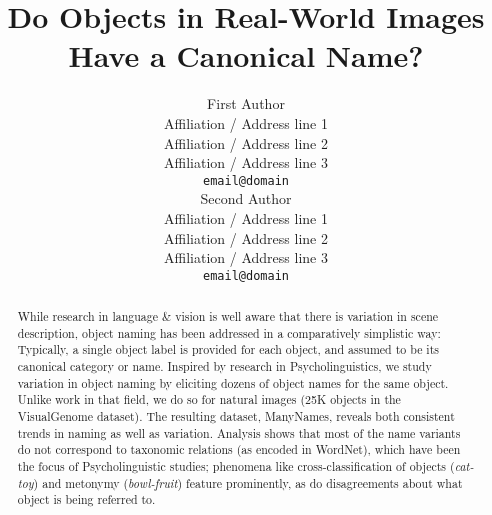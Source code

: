 \documentclass[11pt,a4paper]{article}
\title{Do Objects in Real-World Images Have a Canonical Name?}
\author{First Author \\
  Affiliation / Address line 1 \\
  Affiliation / Address line 2 \\
  Affiliation / Address line 3 \\
  {\tt email@domain} \\\And
  Second Author \\
  Affiliation / Address line 1 \\
  Affiliation / Address line 2 \\
  Affiliation / Address line 3 \\
  {\tt email@domain} \\}
\date{}
\newcommand{\cs}[1]{\textcolor{green!60!black}{\emph{//cs: #1//}}}
\begin{document}
\maketitle

\begin{abstract}
  While research in language \& vision is well aware that there is variation in scene description, object naming has been addressed in a comparatively simplistic way: Typically, a single object label is provided for each object, and assumed to be its canonical category or name.
  Inspired by research in Psycholinguistics, we study variation in object naming by eliciting dozens of object names for the same object.
  Unlike work in that field, we do so for natural images (25K objects in the VisualGenome dataset).
  The resulting dataset, ManyNames, reveals both consistent trends in naming as well as variation.
  Analysis shows that most of the name variants do not correspond to taxonomic relations (as encoded in WordNet), which have been the focus of Psycholinguistic studies; phenomena like cross-classification of objects (\textit{cat-toy}) and metonymy (\textit{bowl-fruit}) feature prominently, as do disagreements about what object is being referred to.

\end{abstract}
\end{document}
